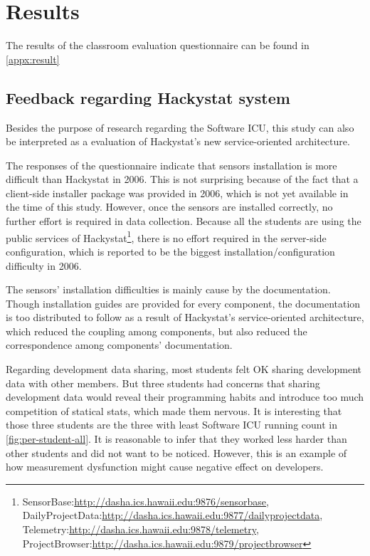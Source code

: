 \chapter {Results}

The results of the classroom evaluation questionnaire can be found in \autoref{appx:result}

\section {Feedback regarding Hackystat system}
Besides the purpose of research regarding the Software ICU, this study can also be interpreted as a evaluation of Hackystat's new service-oriented architecture.

The responses of the questionnaire indicate that sensors installation is more difficult than Hackystat in 2006. This is not surprising because of the fact that a client-side installer package was provided in 2006, which is not yet available in the time of this study. However, once the sensors are installed correctly, no further effort is required in data collection. Because all the students are using the public services of Hackystat\footnote{SensorBase:\url{http://dasha.ics.hawaii.edu:9876/sensorbase}, DailyProjectData:\url{http://dasha.ics.hawaii.edu:9877/dailyprojectdata}, Telemetry:\url{http://dasha.ics.hawaii.edu:9878/telemetry}, ProjectBrowser:\url{http://dasha.ics.hawaii.edu:9879/projectbrowser}}, there is no effort required in the server-side configuration, which is reported to be the biggest installation/configuration difficulty in 2006.

The sensors' installation difficulties is mainly cause by the documentation. Though installation guides are provided for every component, the documentation is too distributed to follow as a result of Hackystat's service-oriented architecture, which reduced the coupling among components, but also reduced the correspondence among components' documentation.

Regarding development data sharing, most students felt OK sharing development data with other members. But three students had concerns that sharing development data would reveal their programming habits and introduce too much competition of statical stats, which made them nervous. It is interesting that those three students are the three with least Software ICU running count in \autoref{fig:per-student-all}. It is reasonable to infer that they worked less harder than other students and did not want to be noticed. However, this is an example of how measurement dysfunction might cause negative effect on developers.


